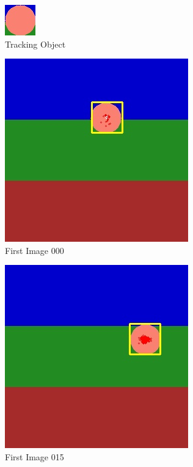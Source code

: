 \documentclass[10pt, conference, compsocconf]{IEEEtran}
\begin{document}
\begin{figure}[H]
	\centering
	\includegraphics[scale = 0.50]{image/template1.png}
	\caption{Tracking Object }
	\label{fig:OBJ}
\end{figure}

\begin{figure}[H]
	\centering
	\includegraphics[scale = 0.30]{image/P1_000.jpg}
	\caption{First Image 000}
	\label{fig:P1_000}
\end{figure}

\begin{figure}[H]
	\centering
	\includegraphics[scale = 0.30]{image/P1_0015.jpg}
	\caption{First Image 015}
	\label{fig:P1_015}
\end{figure}
\end{document}
